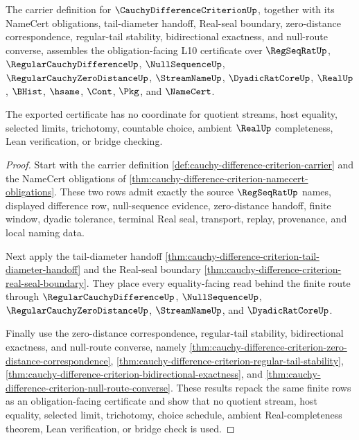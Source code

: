 \begin{theorem}
\label{thm:cauchy-difference-criterion-obligation-export}
The carrier definition for $\CauchyDifferenceCriterionUp$, together with its NameCert obligations, tail-diameter handoff, Real-seal boundary, zero-distance correspondence, regular-tail stability, bidirectional exactness, and null-route converse, assembles the obligation-facing L10 certificate over $\RegSeqRatUp$, $\RegularCauchyDifferenceUp$, $\NullSequenceUp$, $\RegularCauchyZeroDistanceUp$, $\StreamNameUp$, $\DyadicRatCoreUp$, $\RealUp$, $\BHist$, $\hsame$, $\Cont$, $\Pkg$, and $\NameCert$.

The exported certificate has no coordinate for quotient streams, host equality, selected limits, trichotomy, countable choice, ambient $\RealUp$ completeness, Lean verification, or bridge checking.
\end{theorem}
\begin{proof}
Start with the carrier definition \autoref{def:cauchy-difference-criterion-carrier} and the NameCert obligations of \autoref{thm:cauchy-difference-criterion-namecert-obligations}. These two rows admit exactly the source $\RegSeqRatUp$ names, displayed difference row, null-sequence evidence, zero-distance handoff, finite window, dyadic tolerance, terminal Real seal, transport, replay, provenance, and local naming data.

Next apply the tail-diameter handoff \autoref{thm:cauchy-difference-criterion-tail-diameter-handoff} and the Real-seal boundary \autoref{thm:cauchy-difference-criterion-real-seal-boundary}. They place every equality-facing read behind the finite route through $\RegularCauchyDifferenceUp$, $\NullSequenceUp$, $\RegularCauchyZeroDistanceUp$, $\StreamNameUp$, and $\DyadicRatCoreUp$.

Finally use the zero-distance correspondence, regular-tail stability, bidirectional exactness, and null-route converse, namely \autoref{thm:cauchy-difference-criterion-zero-distance-correspondence}, \autoref{thm:cauchy-difference-criterion-regular-tail-stability}, \autoref{thm:cauchy-difference-criterion-bidirectional-exactness}, and \autoref{thm:cauchy-difference-criterion-null-route-converse}. These results repack the same finite rows as an obligation-facing certificate and show that no quotient stream, host equality, selected limit, trichotomy, choice schedule, ambient Real-completeness theorem, Lean verification, or bridge check is used.
\end{proof}

